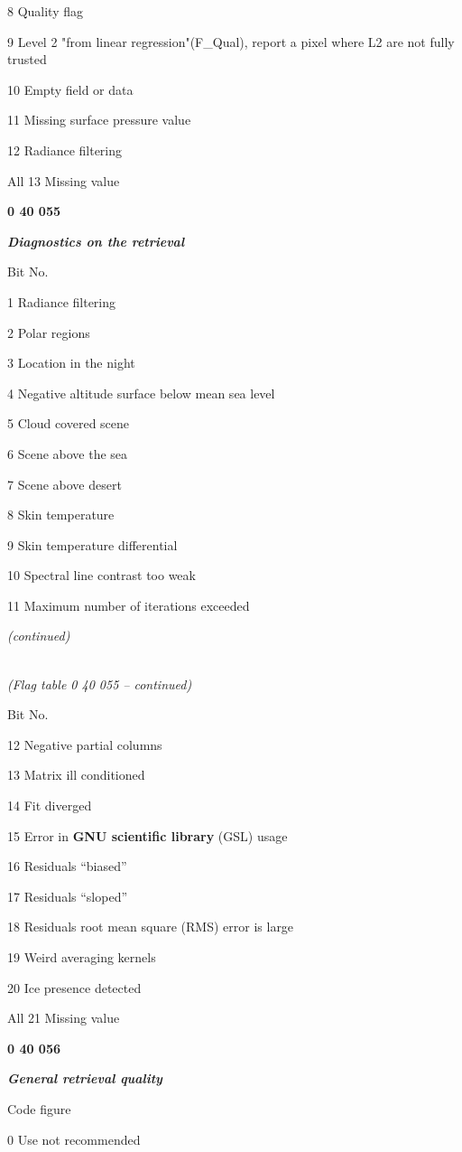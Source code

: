 8 Quality flag

9 Level 2 "from linear regression"(F\_Qual), report a pixel where L2 are not fully trusted

10 Empty field or data

11 Missing surface pressure value

12 Radiance filtering

All 13 Missing value

\textbf{0 40 055}

\emph{\textbf{Diagnostics on the retrieval}}

Bit No.

1 Radiance filtering

2 Polar regions

3 Location in the night

4 Negative altitude surface below mean sea level

5 Cloud covered scene

6 Scene above the sea

7 Scene above desert

8 Skin temperature

9 Skin temperature differential

10 Spectral line contrast too weak

11 Maximum number of iterations exceeded

\emph{(continued)}

\emph{\\
(Flag table 0 40 055 -- continued)}

Bit No.

12 Negative partial columns

13 Matrix ill conditioned

14 Fit diverged

15 Error in \textbf{GNU scientific library} (GSL) usage

16 Residuals ``biased''

17 Residuals ``sloped''

18 Residuals root mean square (RMS) error is large

19 Weird averaging kernels

20 Ice presence detected

All 21 Missing value

\textbf{0 40 056}

\emph{\textbf{General retrieval quality}}

Code figure

0 Use not recommended

